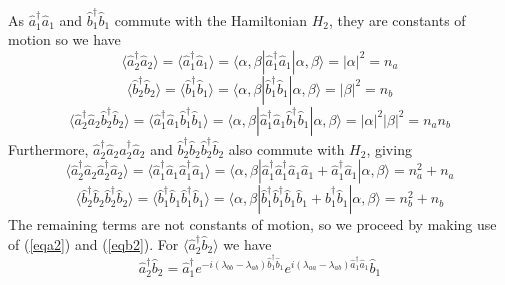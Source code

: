 \documentclass[12pt]{iopart}
\begin{document}
As $\hat{a}^{\dagger}_1 \hat{a}_1$ and $\hat{b}^{\dagger}_1 \hat{b}_1$ commute with the Hamiltonian $H_2$, they are constants of motion so we have
\begin{equation}
\langle \hat{a}^{\dagger}_2 \hat{a}_2 \rangle = \langle \hat{a}^{\dagger}_1 \hat{a}_1 \rangle = \langle \alpha, \beta | \hat{a}^{\dagger}_1 \hat{a}_1 |\alpha, \beta \rangle = |\alpha|^2 = n_a
\end{equation}
%
\begin{equation}
\langle \hat{b}^{\dagger}_2 \hat{b}_2 \rangle = \langle \hat{b}^{\dagger}_1 \hat{b}_1 \rangle = \langle \alpha, \beta | \hat{b}^{\dagger}_1 \hat{b}_1 |\alpha, \beta \rangle = |\beta|^2 = n_b
\end{equation}
%
\begin{equation}
\langle \hat{a}^{\dagger}_2 \hat{a}_2 \hat{b}^{\dagger}_2 \hat{b}_2 \rangle = \langle \hat{a}^{\dagger}_1 \hat{a}_1 \hat{b}^{\dagger}_1 \hat{b}_1 \rangle = \langle \alpha, \beta | \hat{a}^{\dagger}_1 \hat{a}_1 \hat{b}^{\dagger}_1 \hat{b}_1 |\alpha, \beta \rangle = |\alpha|^2 |\beta|^2 = n_a n_b
\end{equation}
Furthermore, $\hat{a}^{\dagger}_2 \hat{a}_2 \hat{a}^{\dagger}_2 \hat{a}_2$ and $\hat{b}^{\dagger}_2 \hat{b}_2 \hat{b}^{\dagger}_2 \hat{b}_2$ also commute with $H_2$, giving
\begin{equation}
\langle \hat{a}^{\dagger}_2 \hat{a}_2 \hat{a}^{\dagger}_2 \hat{a}_2 \rangle = \langle \hat{a}^{\dagger}_1 \hat{a}_1 \hat{a}^{\dagger}_1 \hat{a}_1 \rangle = \langle \alpha, \beta | \hat{a}^{\dagger}_1 \hat{a}^{\dagger}_1 \hat{a}_1 \hat{a}_1 + \hat{a}^{\dagger}_1 \hat{a}_1 |\alpha, \beta \rangle = n_a^2 + n_a
\end{equation}
%
\begin{equation}
\langle \hat{b}^{\dagger}_2 \hat{b}_2 \hat{b}^{\dagger}_2 \hat{b}_2 \rangle = \langle \hat{b}^{\dagger}_1 \hat{b}_1 \hat{b}^{\dagger}_1 \hat{b}_1 \rangle = \langle \alpha, \beta | \hat{b}^{\dagger}_1 \hat{b}^{\dagger}_1 \hat{b}_1 \hat{b}_1 + \hat{b}^{\dagger}_1 \hat{b}_1 |\alpha, \beta \rangle = n_b^2 + n_b
\end{equation}
The remaining terms are not constants of motion, so we proceed by making use of (\ref{eqa2}) and (\ref{eqb2}). For $\langle \hat{a}^{\dagger}_2 \hat{b}_2 \rangle$ we have
\begin{equation}
\hat{a}^{\dagger}_2 \hat{b}_2 = \hat{a}^{\dagger}_1 e^{-i (\lambda_{bb} - \lambda_{ab}) \hat{b}^{\dagger}_1 \hat{b}_1} e^{i (\lambda_{aa} - \lambda_{ab}) \hat{a}^{\dagger}_1 \hat{a}_1} \hat{b}_1 
\end{equation}
\end{document}
